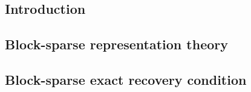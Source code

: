 \subsection{Introduction}


\subsection{Block-sparse representation theory}
\label{sec:Block-sparse_representation_theory} 

\newpage
\subsection{Block-sparse exact recovery condition}
\label{sec:Block-sparse_exact_recovery_condition} 
